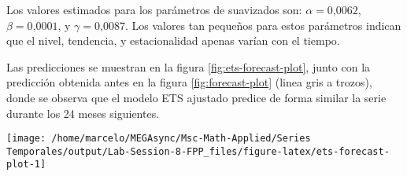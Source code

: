 \documentclass[]{article}
\newenvironment{Shaded}{\begin{snugshade}}{\end{snugshade}}
\newcommand{\DataTypeTok}[1]{\textcolor[rgb]{0.13,0.29,0.53}{#1}}
\newcommand{\DecValTok}[1]{\textcolor[rgb]{0.00,0.00,0.81}{#1}}
\newcommand{\KeywordTok}[1]{\textcolor[rgb]{0.13,0.29,0.53}{\textbf{#1}}}
\newcommand{\NormalTok}[1]{#1}
\newcommand{\OperatorTok}[1]{\textcolor[rgb]{0.81,0.36,0.00}{\textbf{#1}}}
\newcommand{\OtherTok}[1]{\textcolor[rgb]{0.56,0.35,0.01}{#1}}
\newcommand{\StringTok}[1]{\textcolor[rgb]{0.31,0.60,0.02}{#1}}
\begin{document}
Los valores estimados para los parámetros de suavizados son: \(\alpha= \text{0,0062}\), \(\beta= \text{0,0001}\), y \(\gamma= \text{0,0087}\). Los valores tan pequeños para estos parámetros indican que el nivel, tendencia, y estacionalidad apenas varían con el tiempo.

Las predicciones se muestran en la figura \ref{fig:ets-forecast-plot}, junto con la predicción obtenida antes en la figura \ref{fig:forecast-plot} (linea gris a trozos), donde se observa que el modelo ETS ajustado predice de forma similar la serie durante los 24 meses siguientes.

\begin{Shaded}
\end{Shaded}

\begin{center}\texttt{[image: /home/marcelo/MEGAsync/Msc-Math-Applied/Series Temporales/output/Lab-Session-8-FPP\_files/figure-latex/ets-forecast-plot-1]} \end{center}
\end{document}
